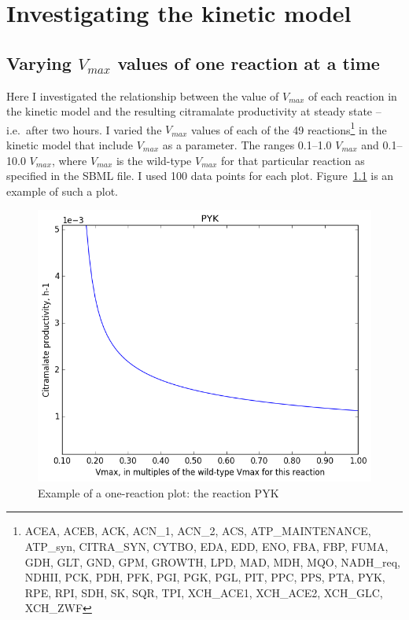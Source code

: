 \documentclass[parskip=full]{scrreprt}
\begin{document}
\chapter{Investigating the kinetic model}
\label{ch:kinetic}


\section{Varying $V_{max}$ values of one reaction at a time}
\label{sec:onereac}

Here I investigated the relationship between the value of $V_{max}$ of each reaction in the kinetic model and the resulting citramalate productivity at steady state -- i.e.\ after two hours. I varied the $V_{max}$ values of each of the 49 reactions\footnote{ACEA, ACEB, ACK, ACN\_1, ACN\_2, ACS, ATP\_MAINTENANCE, ATP\_syn, CITRA\_SYN, CYTBO, EDA, EDD, ENO, FBA, FBP, FUMA, GDH, GLT, GND, GPM, GROWTH, LPD, MAD, MDH, MQO, NADH\_req, NDHII, PCK, PDH, PFK, PGI, PGK, PGL, PIT, PPC, PPS, PTA, PYK, RPE, RPI, SDH, SK, SQR, TPI, XCH\_ACE1, XCH\_ACE2, XCH\_GLC, XCH\_ZWF} in the kinetic model that include $V_{max}$ as a parameter. The ranges 0.1--1.0 $V_{max}$ and 0.1--10.0 $V_{max}$, where $V_{max}$ is the wild-type $V_{max}$ for that particular reaction as specified in the SBML file. I used 100 data points for each plot. Figure~\ref{fig:onereacsample} is an example of such a plot.

\begin{figure}[htbp]
  \centering
  \includegraphics[scale=0.5]{onereacsample}
  \caption{Example of a one-reaction plot: the reaction PYK}
  \label{fig:onereacsample}
\end{figure}
\end{document}
